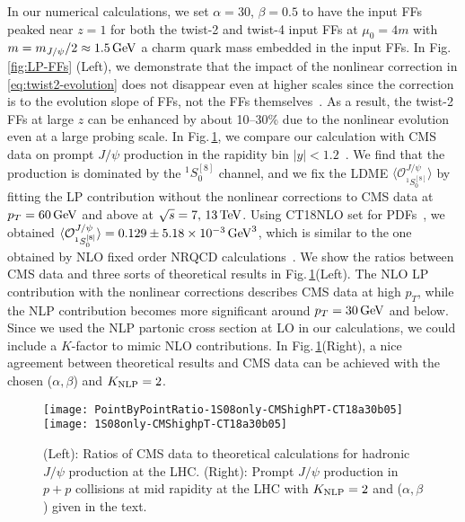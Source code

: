 \documentclass[Physsubmission, Phys]{SciPost}
\begin{document}
In our numerical calculations, we set $\alpha=30$, $\beta=0.5$ to have the input FFs peaked near $z=1$ for both the twist-2 and twist-4 input FFs at $\mu_0=4m$ with $m=m_{J/\psi}/2\approx 1.5\,{\rm GeV}$ a charm quark mass embedded in the input FFs. 
In Fig.\,\ref{fig:LP-FFs} (Left), we demonstrate that the impact of the nonlinear correction in \eqref{eq:twist2-evolution} does not disappear even at higher scales since the correction is to the evolution slope of FFs, not the FFs themselves~\cite{Mueller:1985wy}.  
As a result, the twist-2 FFs at large $z$ can be enhanced by about 10--30\% due to the nonlinear evolution even at a large probing scale.
In Fig.\,\ref{fig:xsection}, we compare our calculation with CMS data on prompt $J/\psi$ production in the rapidity bin $|y|<1.2$~\cite{Khachatryan:2015rra,Sirunyan:2017qdw}. 
We find that the production is dominated by the ${^1S_0^{[8]}}$ channel, and we fix the LDME $\langle \mathcal{O}_{^1S_0^{[8]}}^{J/\psi}\rangle$ by fitting the LP contribution without the nonlinear corrections to CMS data at $p_T=60\,{\rm GeV}$ and above at $\sqrt{s}=7,\,13\,{\rm TeV}$. Using CT18NLO set for PDFs~\cite{Hou:2019efy}, we obtained $\langle \mathcal{O}_{^1S_0^{[8]}}^{J/\psi}\rangle =0.129 \pm 5.18\times 10^{-3}\,{\rm GeV}^3$, which is similar to the one obtained by NLO fixed order NRQCD calculations~\cite{Chao:2012iv}. 
We show the ratios between CMS data and three sorts of theoretical results in Fig.\,\ref{fig:xsection}(Left).
The NLO LP contribution with the nonlinear corrections describes CMS data at high $p_T$, while the NLP contribution becomes more significant around $p_T=30\,{\rm GeV}$ and below.  Since we used the NLP partonic cross section at LO in our calculations, we could include a $K$-factor to mimic NLO contributions. In Fig.\,\ref{fig:xsection}(Right), a nice agreement between theoretical results and CMS data can be achieved with the chosen ($\alpha,\beta$) and $K_{\rm NLP}=2$. 


\begin{figure}[t]
\centering
\texttt{[image: PointByPointRatio-1S08only-CMShighPT-CT18a30b05]}
\texttt{[image: 1S08only-CMShighpT-CT18a30b05]}
\caption{(Left): Ratios of CMS data to theoretical calculations for hadronic $J/\psi$ production at the LHC. 
(Right): 
Prompt $J/\psi$ production in $p+p$ collisions at mid rapidity at the LHC with $K_{\rm NLP}=2$ and ($\alpha,\beta$) given in the text.
}
\label{fig:xsection}
\end{figure}
\end{document}
